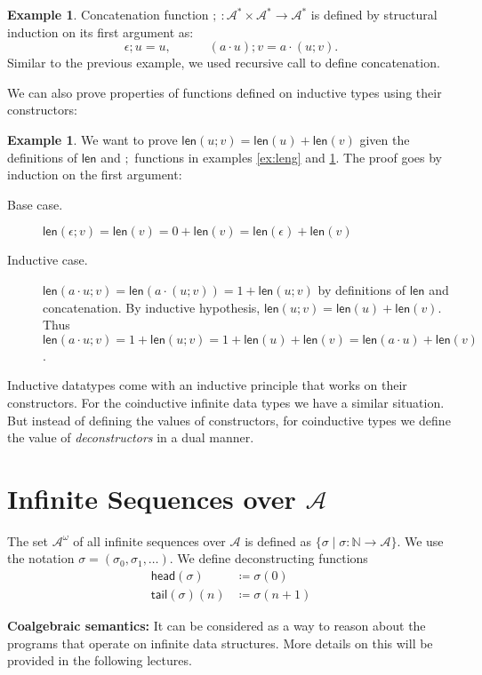 \documentclass{article}
\newcommand{\alphA}{\mathcal{A}}
\newcommand{\natN}{\mathbb{N}}
\newcommand{\len}{\mathsf{len}}
\newcommand{\head}{\mathsf{head}}
\newcommand{\tail}{\mathsf{tail}}
\theoremstyle{definition}
\theoremstyle{definition}
\newtheorem{example}[theorem]{Example}
\begin{document}
\begin{example}\label{ex:concat}
Concatenation function $;\ \colon \alphA^* \times \alphA^* \to \alphA^*$ is defined by structural induction on its first argument as:
$$\epsilon;u=u, \quad  \quad \quad (a\cdot u); v= a \cdot (u;v).$$
Similar to the previous example, we used recursive call to define concatenation.
\end{example}
We can also prove properties of functions defined on inductive types using their constructors:
\begin{example}
We want to prove $\len(u;v)= \len(u)+\len(v)$ given the definitions of $\len$ and $;$ functions in examples \ref{ex:leng} and \ref{ex:concat}. The proof goes by induction on the first argument:
\begin{description}
    \item[Base case.] $\len(\epsilon;v) = \len(v) = 0+\len(v) = \len(\epsilon)+\len(v)$
    \item[Inductive case.] $\len(a \cdot u;v)=\len(a\cdot(u;v))=1+\len(u;v)$ by definitions of $\len$ and concatenation.
By inductive hypothesis, $\len(u;v) = \len(u)+\len(v)$. Thus $\len(a \cdot u;v)= 1+\len(u;v) = 1 + \len(u)+\len(v) = \len(a\cdot u)+\len(v)$.
\end{description}
\end{example}
Inductive datatypes come with an inductive principle that works on their constructors. For the coinductive infinite data types we have a similar situation. But instead of defining the values of constructors, for coinductive types we define the value of {\it deconstructors} in a dual manner. 

\section{Infinite Sequences over $\alphA$}
The set $\alphA^\omega$ of all infinite sequences over $\alphA$ is defined as $\{\sigma \mid \sigma \colon \natN\to \alphA \}$. We use the notation $\sigma = (\sigma_0, \sigma_1, \dots ) $. We define deconstructing functions
\begin{align*}
   \head(\sigma) & \coloneqq \sigma(0) \\
   \tail(\sigma)(n) & \coloneqq \sigma(n+1)
\end{align*}
 
\textbf{Coalgebraic semantics:} It can be considered as a way to reason about the programs that operate on infinite data structures. More details on this will be provided in the following lectures.
 
\end{document}
